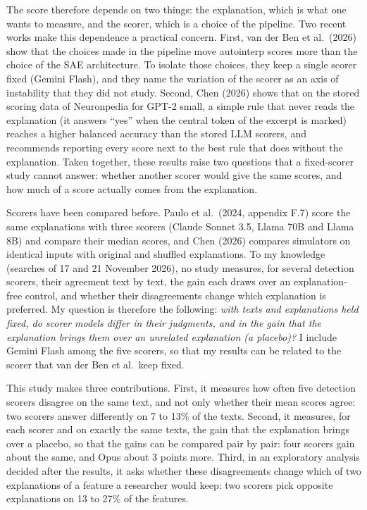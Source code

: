 \documentclass[11pt]{article}
\begin{document}
The score therefore depends on two things: the explanation, which is what one wants to
measure, and the scorer, which is a choice of the pipeline. Two recent works make this
dependence a practical concern. First, van der Ben et al.\ (2026) show that the choices
made in the pipeline move autointerp scores more than the choice of the SAE architecture.
To isolate those choices, they keep a single scorer fixed (Gemini Flash), and they name
the variation of the scorer as an axis of instability that they did not study. Second, Chen (2026) shows that on the stored scoring data of
Neuronpedia for GPT-2 small, a simple rule that never reads the explanation (it answers
``yes'' when the central token of the excerpt is marked) reaches a higher balanced
accuracy than the stored LLM scorers, and recommends reporting every score next to the
best rule that does without the explanation. Taken together, these results raise
two questions that a fixed-scorer study cannot answer: whether another scorer would give
the same scores, and how much of a score actually comes from the explanation.

Scorers have been compared before. Paulo et al.\ (2024, appendix F.7) score the same
explanations with three scorers (Claude Sonnet 3.5, Llama 70B and Llama 8B) and compare
their median scores, and Chen (2026) compares simulators on identical inputs with
original and shuffled explanations. To my knowledge
(searches of 17 and 21 November 2026), no study measures, for several detection scorers,
their agreement text by text, the gain each draws over an explanation-free control, and
whether their disagreements change which explanation is preferred. My question is
therefore the following: \emph{with texts and explanations held fixed, do scorer models differ in their
judgments, and in the gain that the explanation brings them over an unrelated
explanation (a placebo)?} I include Gemini Flash among the five scorers, so that my
results can be related to the scorer that van der Ben et al.\ keep fixed.

This study makes three contributions. First, it measures how often five detection
scorers disagree on the same text, and not only whether their mean scores agree: two
scorers answer differently on 7 to 13\% of the texts. Second, it measures, for each
scorer and on exactly the same texts, the gain that the explanation brings over a
placebo, so that the gains can be compared pair by pair: four scorers gain about the
same, and Opus about 3 points more. Third, in an exploratory analysis decided after the
results, it asks whether these disagreements change which of two explanations of a
feature a researcher would keep: two scorers pick opposite explanations on 13 to 27\%
of the features.
\end{document}

